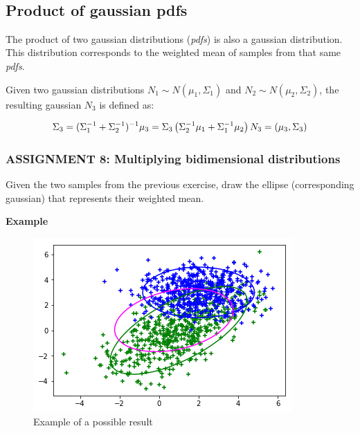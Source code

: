 \documentclass[11pt]{article}
\begin{document}
    \begin{center}
    \end{center}
    { \hspace*{\fill} \\}
    
    \hypertarget{product-of-gaussian-pdfs}{%
\subsection{Product of gaussian pdfs}\label{product-of-gaussian-pdfs}}

The product of two gaussian distributions (\emph{pdfs}) is also a
gaussian distribution. This distribution corresponds to the weighted
mean of samples from that same \emph{pdfs}.

Given two gaussian distributions \(N_1 \sim N(\mu_1, \Sigma_1)\) and
\(N_2 \sim N(\mu_2, \Sigma_2)\), the resulting gaussian \(N_3\) is
defined as:

\[
\begin{equation}
    \Sigma_3 = (\Sigma_1^{-1} +\Sigma_2^{-1} )^{-1} \\
    \mu_3 =
           \Sigma_3
        \left(
            \Sigma_2^{-1} \mu_1 + \Sigma_1^{-1} \mu_2
        \right)\\
     N_3 =
         \left(
             \mu_3,
             \Sigma_3
         \right)
\end{equation}
\]

    \hypertarget{assignment-8-multiplying-bidimensional-distributions}{%
\subsubsection{\texorpdfstring{\textbf{{ASSIGNMENT 8: Multiplying
bidimensional
distributions}}}{ASSIGNMENT 8: Multiplying bidimensional distributions}}\label{assignment-8-multiplying-bidimensional-distributions}}

Given the two samples from the previous exercise, draw the ellipse
(corresponding gaussian) that represents their weighted mean.

\textbf{Example}

\begin{figure}
\centering
\includegraphics{images/fig2-3-2.png}
\caption{Example of a possible result}
\end{figure}
\end{document}
